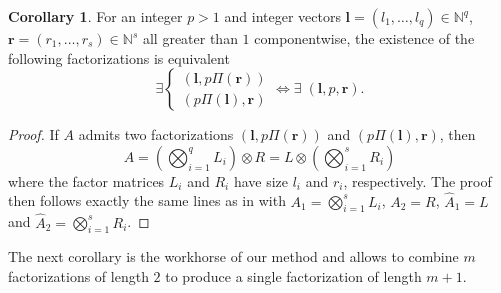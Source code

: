 \documentclass{article}
\numberwithin{equation}{section}
\theoremstyle{definition}
\newtheorem{corollary}[definition]{Corollary}
\begin{document}
\begin{corollary}
\label{cor: cor_fact1}
For an integer $p>1$ and integer vectors $\bm{l}=(l_1,\dots,l_q) \in \mathbb{N}^q$, $\bm{r}=(r_1,\dots,r_s) \in \mathbb{N}^s$ all greater than $1$ componentwise, the existence of the following factorizations is equivalent
\begin{equation*}
    \exists
    \begin{cases}
        (\bm{l},p\Pi(\bm{r})) \\
        (p\Pi(\bm{l}),\bm{r})
    \end{cases}
    \iff \exists \; (\bm{l},p,\bm{r}).
\end{equation*}
\end{corollary}
\begin{proof}
If $A$ admits two factorizations $(\bm{l},p\Pi(\bm{r}))$ and $(p\Pi(\bm{l}),\bm{r})$, then
\begin{equation*}
    A = \left(\bigotimes_{i=1}^{q} L_i \right) \otimes R = L \otimes \left(\bigotimes_{i=1}^{s} R_i \right)
\end{equation*}
where the factor matrices $L_i$ and $R_i$ have size $l_i$ and $r_i$, respectively. The proof then follows exactly the same lines as in  with $A_1 = \bigotimes_{i=1}^{s} L_i$, $A_2 = R$, $\hat{A}_1 = L$ and $\hat{A}_2 = \bigotimes_{i=1}^{s} R_i$.
\end{proof}

The next corollary is the workhorse of our method and allows to combine $m$ factorizations of length $2$ to produce a single factorization of length $m+1$.
\end{document}
